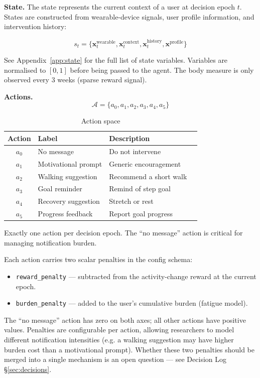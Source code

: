 \documentclass[11pt,a4paper]{article}
\begin{document}
\textbf{State.} The state represents the current context of a user at decision epoch $t$.
States are constructed from wearable-device signals, user profile
information, and intervention history:

\[
s_t = \{ \mathbf{x}_t^{\text{wearable}}, \mathbf{x}_t^{\text{context}},
\mathbf{x}_t^{\text{history}}, \mathbf{x}^{\text{profile}} \}
\]

See Appendix~\ref{app:state} for the full list of state variables.
Variables are normalised to $[0,1]$ before being passed to the agent. The
body measure is only observed every 3 weeks (sparse reward signal).

\textbf{Actions.}
\[
\mathcal{A} = \{ a_0, a_1, a_2, a_3, a_4, a_5 \}
\]

\begin{table}[H]
\centering
\caption{Action space}
\begin{tabular}{clll}
\toprule
Action & Label & Description \\
\midrule
$a_0$ & No message & Do not intervene \\
$a_1$ & Motivational prompt & Generic encouragement \\
$a_2$ & Walking suggestion & Recommend a short walk \\
$a_3$ & Goal reminder & Remind of step goal \\
$a_4$ & Recovery suggestion & Stretch or rest \\
$a_5$ & Progress feedback & Report goal progress \\
\bottomrule
\end{tabular}
\end{table}

Exactly one action per decision epoch. The ``no message'' action is critical
for managing notification burden.

Each action carries two scalar penalties in the config schema:
\begin{itemize}[noitemsep]
    \item \texttt{reward\_penalty} --- subtracted from the activity-change reward at the current epoch.
    \item \texttt{burden\_penalty} --- added to the user's cumulative burden (fatigue model).
\end{itemize}
The ``no message'' action has zero on both axes; all other actions have
positive values. Penalties are configurable per action, allowing researchers
to model different notification intensities (e.g. a walking suggestion may
have higher burden cost than a motivational prompt). Whether these two
penalties should be merged into a single mechanism is an open question
--- see Decision Log \S\ref{sec:decisions}.
\end{document}
